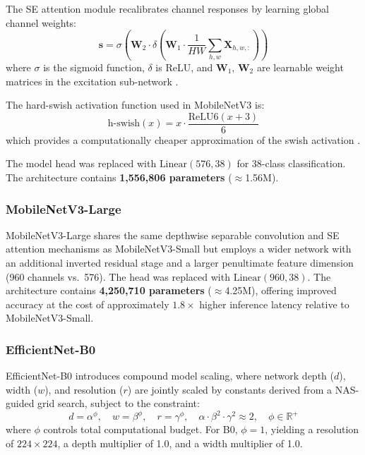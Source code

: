 \documentclass[pdflatex,sn-mathphys-num]{sn-jnl}
\begin{document}
The SE attention module recalibrates channel responses by learning global channel weights:
\begin{equation}
  \mathbf{s} = \sigma\!\left( \mathbf{W}_2 \cdot \delta\!\left( \mathbf{W}_1 \cdot
  \frac{1}{HW}\sum_{h,w} \mathbf{X}_{h,w,:} \right) \right)
  \label{eq:se}
\end{equation}
where $\sigma$ is the sigmoid function, $\delta$ is ReLU, and $\mathbf{W}_1$,
$\mathbf{W}_2$ are learnable weight matrices in the excitation sub-network
\citep{hu2018squeeze}.

The hard-swish activation function used in MobileNetV3 is:
\begin{equation}
  \text{h-swish}(x) = x \cdot \frac{\text{ReLU6}(x + 3)}{6}
  \label{eq:hswish}
\end{equation}
which provides a computationally cheaper approximation of the swish activation
\citep{howard2019mobilenetv3}.

The model head was replaced with $\text{Linear}(576, 38)$ for 38-class classification.
The architecture contains \textbf{1{,}556{,}806 parameters} ($\approx$1.56M).

\subsubsection{MobileNetV3-Large}

MobileNetV3-Large \citep{howard2019mobilenetv3} shares the same depthwise separable
convolution and SE attention mechanisms as MobileNetV3-Small but employs a wider
network with an additional inverted residual stage and a larger penultimate feature
dimension (960 channels vs.\ 576). The head was replaced with $\text{Linear}(960, 38)$.
The architecture contains \textbf{4{,}250{,}710 parameters} ($\approx$4.25M), offering
improved accuracy at the cost of approximately $1.8\times$ higher inference latency
relative to MobileNetV3-Small.

\subsubsection{EfficientNet-B0}

EfficientNet-B0 \citep{tan2019efficientnet} introduces compound model scaling, where
network depth ($d$), width ($w$), and resolution ($r$) are jointly scaled by constants
derived from a NAS-guided grid search, subject to the constraint:
\begin{equation}
  d = \alpha^\phi, \quad w = \beta^\phi, \quad r = \gamma^\phi, \quad
  \alpha \cdot \beta^2 \cdot \gamma^2 \approx 2, \quad \phi \in \mathbb{R}^+
  \label{eq:compound_scaling}
\end{equation}
where $\phi$ controls total computational budget. For B0, $\phi = 1$, yielding a
resolution of $224\times224$, a depth multiplier of 1.0, and a width multiplier of 1.0.
\end{document}
